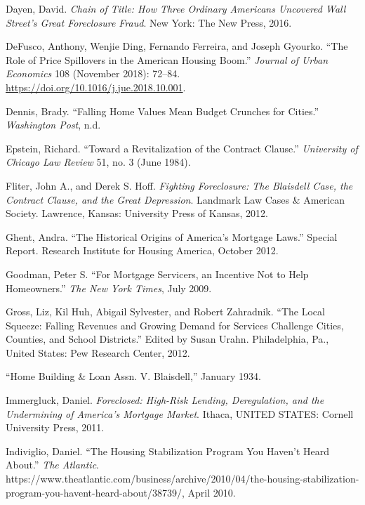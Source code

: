 \documentclass[
]{article}
\begin{document}
\leavevmode\hypertarget{ref-dayenChainTitleHow2016}{}%
Dayen, David. \emph{Chain of Title: How Three Ordinary Americans
Uncovered Wall Street's Great Foreclosure Fraud}. New York: The New
Press, 2016.

\leavevmode\hypertarget{ref-defusco2018role}{}%
DeFusco, Anthony, Wenjie Ding, Fernando Ferreira, and Joseph Gyourko.
``The Role of Price Spillovers in the American Housing Boom.''
\emph{Journal of Urban Economics} 108 (November 2018): 72--84.
\url{https://doi.org/10.1016/j.jue.2018.10.001}.

\leavevmode\hypertarget{ref-dennis2011falling}{}%
Dennis, Brady. ``Falling Home Values Mean Budget Crunches for Cities.''
\emph{Washington Post}, n.d.

\leavevmode\hypertarget{ref-epstein1984revitalization}{}%
Epstein, Richard. ``Toward a Revitalization of the Contract Clause.''
\emph{University of Chicago Law Review} 51, no. 3 (June 1984).

\leavevmode\hypertarget{ref-fliter2012fighting}{}%
Fliter, John A., and Derek S. Hoff. \emph{Fighting Foreclosure: The
Blaisdell Case, the Contract Clause, and the Great Depression}. Landmark
Law Cases \& American Society. Lawrence, Kansas: University Press of
Kansas, 2012.

\leavevmode\hypertarget{ref-ghent2012historical}{}%
Ghent, Andra. ``The Historical Origins of America's Mortgage Laws.''
Special Report. Research Institute for Housing America, October 2012.

\leavevmode\hypertarget{ref-goodman2009mortgage}{}%
Goodman, Peter S. ``For Mortgage Servicers, an Incentive Not to Help
Homeowners.'' \emph{The New York Times}, July 2009.

\leavevmode\hypertarget{ref-gross2012local}{}%
Gross, Liz, Kil Huh, Abigail Sylvester, and Robert Zahradnik. ``The
Local Squeeze: Falling Revenues and Growing Demand for Services
Challenge Cities, Counties, and School Districts.'' Edited by Susan
Urahn. Philadelphia, Pa., United States: Pew Research Center, 2012.

\leavevmode\hypertarget{ref-1934home}{}%
``Home Building \& Loan Assn. V. Blaisdell,'' January 1934.

\leavevmode\hypertarget{ref-immergluck2011foreclosed}{}%
Immergluck, Daniel. \emph{Foreclosed: High-Risk Lending, Deregulation,
and the Undermining of America's Mortgage Market}. Ithaca, UNITED
STATES: Cornell University Press, 2011.

\leavevmode\hypertarget{ref-indiviglio2010housing}{}%
Indiviglio, Daniel. ``The Housing Stabilization Program You Haven't
Heard About.'' \emph{The Atlantic}.
https://www.theatlantic.com/business/archive/2010/04/the-housing-stabilization-program-you-havent-heard-about/38739/,
April 2010.
\end{document}
